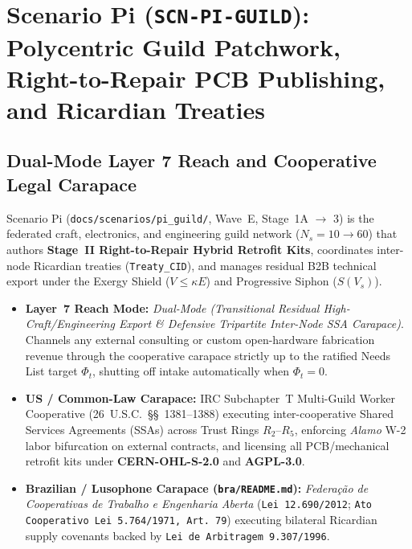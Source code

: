 \chapter{Scenario Pi (\texttt{SCN-PI-GUILD}): Polycentric Guild Patchwork, Right-to-Repair PCB Publishing, and Ricardian Treaties}
\label{app:scenario-pi}

\section{Dual-Mode Layer 7 Reach and Cooperative Legal Carapace}
Scenario Pi (\texttt{docs/scenarios/pi\_guild/}, Wave~E, Stage~1A $\to$ 3) is the federated craft, electronics, and engineering guild network ($N_s = 10 \to 60$) that authors \textbf{Stage~II Right-to-Repair Hybrid Retrofit Kits}, coordinates inter-node Ricardian treaties (\texttt{Treaty\_CID}), and manages residual B2B technical export under the Exergy Shield ($V \le \kappa E$) and Progressive Siphon ($S(V_s)$).
\begin{itemize}
    \item \textbf{Layer~7 Reach Mode:} \textit{Dual-Mode (Transitional Residual High-Craft/Engineering Export \& Defensive Tripartite Inter-Node SSA Carapace)}. Channels any external consulting or custom open-hardware fabrication revenue through the cooperative carapace strictly up to the ratified Needs List target $\Phi_t$, shutting off intake automatically when $\Phi_t = 0$.
    \item \textbf{US / Common-Law Carapace:} IRC Subchapter~T Multi-Guild Worker Cooperative (26~U.S.C.~\S\S~1381--1388) executing inter-cooperative Shared Services Agreements (SSAs) across Trust Rings $R_2\text{--}R_5$, enforcing \textit{Alamo} W-2 labor bifurcation on external contracts, and licensing all PCB/mechanical retrofit kits under \textbf{CERN-OHL-S-2.0} and \textbf{AGPL-3.0}.
    \item \textbf{Brazilian / Lusophone Carapace (\texttt{bra/README.md}):} \textit{Federa{\c{c}}{\~a}o de Cooperativas de Trabalho e Engenharia Aberta} (\texttt{Lei 12.690/2012}; \texttt{Ato Cooperativo Lei 5.764/1971, Art.~79}) executing bilateral Ricardian supply covenants backed by \texttt{Lei de Arbitragem 9.307/1996}.
\end{itemize}


